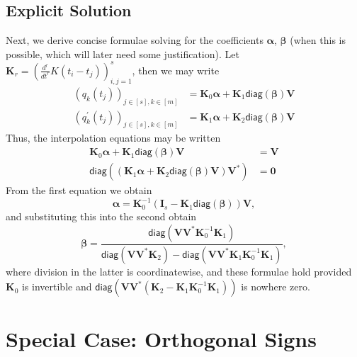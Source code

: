 \documentclass[11pt]{article}
\newcommand{\diag}{\mathsf{diag}}
\newcommand{\balpha}{\bm \alpha}
\newcommand{\bbeta}{\bm \beta}
\newcommand{\bK}{\bm K}
\newcommand{\bV}{\bm V}
\begin{document}
\subsection{Explicit Solution}

Next, we derive concise formulae solving for the coefficients $\bm \alpha$, $\bm \beta$ (when this is possible, which will later need some justification).
Let $\bK_r = (\frac{d^r}{dt^r}K(t_i - t_j))_{i, j = 1}^s$, then we may write
\begin{align}
  (q_k(t_j))_{j \in [s], k \in [m]} &= \bK_0 \balpha + \bK_1\diag(\bbeta) \bV \\
  (q_k^\prime(t_j))_{j \in [s], k \in [m]} &= \bK_1 \balpha + \bK_2\diag(\bbeta) \bV
\end{align}
Thus, the interpolation equations may be written
\begin{align}
  \bK_0 \balpha + \bK_1\diag(\bbeta) \bV &= \bV \\
  \diag((\bK_1 \balpha + \bK_2\diag(\bbeta) \bV)\bV^*) &= \bm 0
\end{align}
From the first equation we obtain
\begin{equation}
    \balpha = \bK_0^{-1}(\bm I_s - \bK_1 \diag(\bbeta))\bV,
\end{equation}
and substituting this into the second obtain
\begin{equation}
    \bbeta = \frac{\diag(\bV\bV^*\bK_0^{-1}\bK_1)}{\diag(\bV\bV^*\bK_2) - \diag(\bV\bV^*\bK_1\bK_0^{-1}\bK_1)},
\end{equation}
where division in the latter is coordinatewise, and these formulae hold provided $\bK_0$ is invertible and $\diag(\bV\bV^*(\bK_2 - \bK_1\bK_0^{-1}\bK_1))$ is nowhere zero.

\section{Special Case: Orthogonal Signs}
\end{document}
